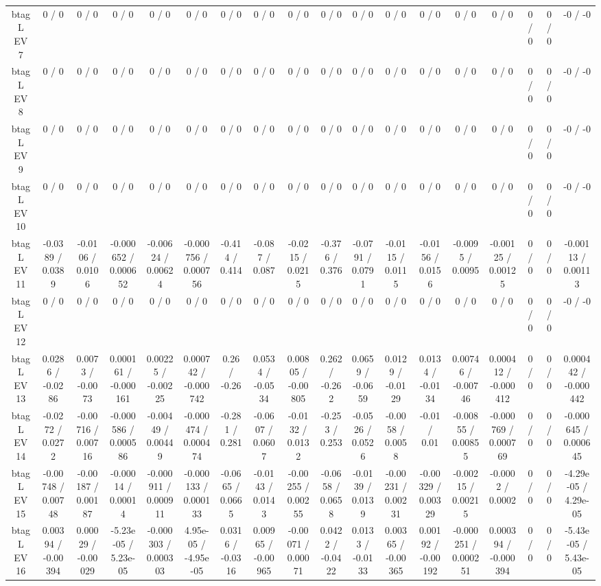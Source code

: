 \documentclass[10pt]{article}
\begin{document}
\begin{table}[htbp]
\begin{center}
\begin{tabular}{|c|c|c|c|c|c|c|c|c|c|c|c|c|c|c|c|c|c|}
  btag L EV 7 & 0 / 0 & 0 / 0 & 0 / 0 & 0 / 0 & 0 / 0 & 0 / 0 & 0 / 0 & 0 / 0 & 0 / 0 & 0 / 0 & 0 / 0 & 0 / 0 & 0 / 0 & 0 / 0 & 0 / 0 & 0 / 0 & -0 / -0 \\ 
  btag L EV 8 & 0 / 0 & 0 / 0 & 0 / 0 & 0 / 0 & 0 / 0 & 0 / 0 & 0 / 0 & 0 / 0 & 0 / 0 & 0 / 0 & 0 / 0 & 0 / 0 & 0 / 0 & 0 / 0 & 0 / 0 & 0 / 0 & -0 / -0 \\ 
  btag L EV 9 & 0 / 0 & 0 / 0 & 0 / 0 & 0 / 0 & 0 / 0 & 0 / 0 & 0 / 0 & 0 / 0 & 0 / 0 & 0 / 0 & 0 / 0 & 0 / 0 & 0 / 0 & 0 / 0 & 0 / 0 & 0 / 0 & -0 / -0 \\ 
  btag L EV 10 & 0 / 0 & 0 / 0 & 0 / 0 & 0 / 0 & 0 / 0 & 0 / 0 & 0 / 0 & 0 / 0 & 0 / 0 & 0 / 0 & 0 / 0 & 0 / 0 & 0 / 0 & 0 / 0 & 0 / 0 & 0 / 0 & -0 / -0 \\ 
  btag L EV 11 & -0.0389 / 0.0389 & -0.0106 / 0.0106 & -0.000652 / 0.000652 & -0.00624 / 0.00624 & -0.000756 / 0.000756 & -0.414 / 0.414 & -0.087 / 0.087 & -0.0215 / 0.0215 & -0.376 / 0.376 & -0.0791 / 0.0791 & -0.0115 / 0.0115 & -0.0156 / 0.0156 & -0.0095 / 0.0095 & -0.00125 / 0.00125 & 0 / 0 & 0 / 0 & -0.00113 / 0.00113 \\ 
  btag L EV 12 & 0 / 0 & 0 / 0 & 0 / 0 & 0 / 0 & 0 / 0 & 0 / 0 & 0 / 0 & 0 / 0 & 0 / 0 & 0 / 0 & 0 / 0 & 0 / 0 & 0 / 0 & 0 / 0 & 0 / 0 & 0 / 0 & -0 / -0 \\ 
  btag L EV 13 & 0.0286 / -0.0286 & 0.0073 / -0.0073 & 0.000161 / -0.000161 & 0.00225 / -0.00225 & 0.000742 / -0.000742 & 0.26 / -0.26 & 0.0534 / -0.0534 & 0.00805 / -0.00805 & 0.262 / -0.262 & 0.0659 / -0.0659 & 0.0129 / -0.0129 & 0.0134 / -0.0134 & 0.00746 / -0.00746 & 0.000412 / -0.000412 & 0 / 0 & 0 / 0 & 0.000442 / -0.000442 \\ 
  btag L EV 14 & -0.0272 / 0.0272 & -0.00716 / 0.00716 & -0.000586 / 0.000586 & -0.00449 / 0.00449 & -0.000474 / 0.000474 & -0.281 / 0.281 & -0.0607 / 0.0607 & -0.0132 / 0.0132 & -0.253 / 0.253 & -0.0526 / 0.0526 & -0.0058 / 0.0058 & -0.01 / 0.01 & -0.00855 / 0.00855 & -0.000769 / 0.000769 & 0 / 0 & 0 / 0 & -0.000645 / 0.000645 \\ 
  btag L EV 15 & -0.00748 / 0.00748 & -0.00187 / 0.00187 & -0.00014 / 0.00014 & -0.000911 / 0.000911 & -0.000133 / 0.000133 & -0.0665 / 0.0665 & -0.0143 / 0.0143 & -0.00255 / 0.00255 & -0.0658 / 0.0658 & -0.0139 / 0.0139 & -0.00231 / 0.00231 & -0.00329 / 0.00329 & -0.00215 / 0.00215 & -0.0002 / 0.0002 & 0 / 0 & 0 / 0 & -4.29e-05 / 4.29e-05 \\ 
  btag L EV 16 & 0.00394 / -0.00394 & 0.00029 / -0.00029 & -5.23e-05 / 5.23e-05 & -0.000303 / 0.000303 & 4.95e-05 / -4.95e-05 & 0.0316 / -0.0316 & 0.00965 / -0.00965 & -0.00071 / 0.00071 & 0.0422 / -0.0422 & 0.0133 / -0.0133 & 0.00365 / -0.00365 & 0.00192 / -0.00192 & -0.000251 / 0.000251 & 0.000394 / -0.000394 & 0 / 0 & 0 / 0 & -5.43e-05 / 5.43e-05 \\ 

\end{tabular}
\end{center}
\end{table}
\end{document}
